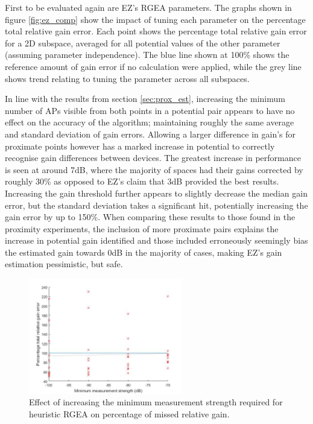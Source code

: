\documentclass{UoYCSproject}
\begin{document}
                First to be evaluated again are EZ's RGEA parameters. The graphs shown in figure \ref{fig:ez_comp} show the impact of tuning each parameter on the percentage total relative gain error. Each point shows the percentage total relative gain error for a 2D subspace, averaged for all potential values of the other parameter (assuming parameter independence). The blue line shown at 100\% shows the reference amount of gain error if no calculation were applied, while the grey line shows trend relating to tuning the parameter across all subspaces.
                
                In line with the results from section \ref{sec:prox_est}, increasing the minimum number of APs visible from both points in a potential pair appears to have no effect on the accuracy of the algorithm; maintaining roughly the same average and standard deviation of gain errors. Allowing a larger difference in gain's for proximate points however has a marked increase in potential to correctly recognise gain differences between devices. The greatest increase in performance is seen at around 7dB, where the majority of spaces had their gains corrected by roughly 30\% as opposed to EZ's claim that 3dB provided the best results. Increasing the gain threshold further appears to slightly decrease the median gain error, but the standard deviation takes a significant hit, potentially increasing the gain error by up to 150\%. When comparing these results to those found in the proximity experiments, the inclusion of more proximate pairs explains the increase in potential gain identified and those included erroneously seemingly bias the estimated gain towards $0$dB in the majority of cases, making EZ's gain estimation pessimistic, but safe.
                
                \begin{figure}[h]
                    \label{fig:h_minAP}
                    \centering
                    \includegraphics[width=0.6\textwidth]{h_minAP.jpg}
                    \caption{Effect of increasing the minimum measurement strength required for heuristic RGEA on percentage of missed relative gain.}
                \end{figure}
                
\end{document}
